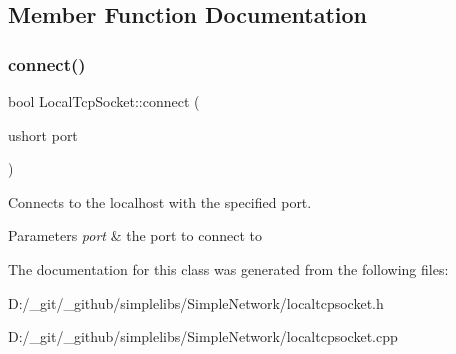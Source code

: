 \subsection{Member Function Documentation}
\mbox{\label{class_local_tcp_socket_a3ffd411649714ba72f10a9d65f5e52ab}} 
\subsubsection{\texorpdfstring{connect()}{connect()}}
{\footnotesize\ttfamily bool Local\+Tcp\+Socket\+::connect (\begin{DoxyParamCaption}\item[{ushort}]{port }\end{DoxyParamCaption})}



Connects to the localhost with the specified port. 


\begin{DoxyParams}{Parameters}
{\em port} & the port to connect to \\
\hline
\end{DoxyParams}


The documentation for this class was generated from the following files\+:\begin{DoxyCompactItemize}
\item 
D\+:/\+\_\+git/\+\_\+github/simplelibs/\+Simple\+Network/localtcpsocket.\+h\item 
D\+:/\+\_\+git/\+\_\+github/simplelibs/\+Simple\+Network/localtcpsocket.\+cpp\end{DoxyCompactItemize}
